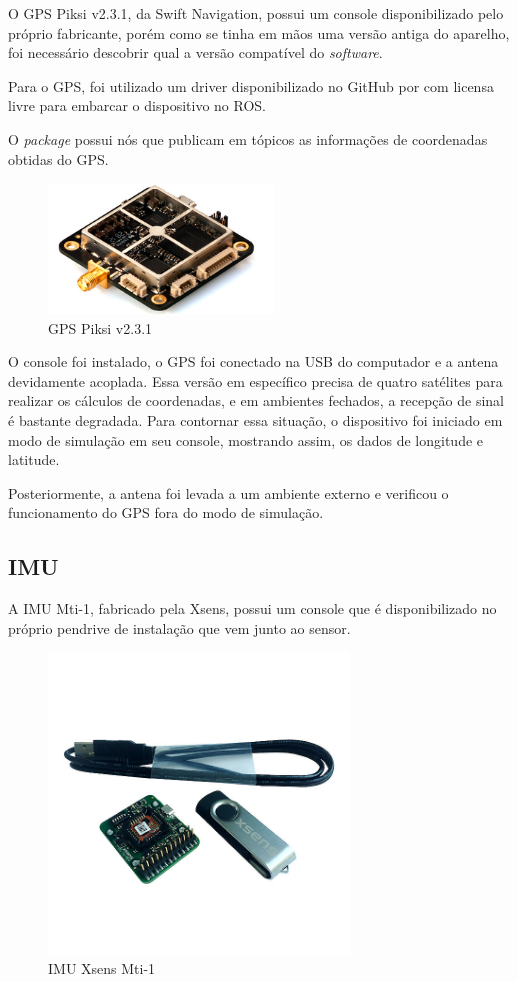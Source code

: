 	    O GPS Piksi v2.3.1, da Swift Navigation, possui um console disponibilizado pelo próprio fabricante, porém como se tinha em mãos uma versão antiga do aparelho, foi necessário descobrir qual a versão compatível do \textit{software}.
	    
	    Para o GPS, foi utilizado um driver disponibilizado no GitHub por  com licensa livre para embarcar o dispositivo no ROS.
     
     O \textit{package} possui nós que publicam em tópicos as informações de coordenadas obtidas do GPS.
	    
	    \begin{figure}[!ht]
				   \centering
				   \includegraphics[width=6cm]{Figures/gps.jpg}
				   \caption{GPS Piksi v2.3.1}
				   \label{fig:GPS}
		\end{figure}
			    
	     O console foi instalado, o GPS foi conectado na USB do computador e a antena devidamente acoplada. Essa versão em específico precisa de quatro satélites para realizar os cálculos de coordenadas, e em ambientes fechados, a recepção de sinal é bastante degradada. Para contornar essa situação, o dispositivo foi iniciado em modo de simulação em seu console, mostrando assim, os dados de longitude e latitude.
	     
	     Posteriormente, a antena foi levada a um ambiente externo e verificou o funcionamento do GPS fora do modo de simulação.    

	\subsection{IMU}
	    
	    A IMU Mti-1, fabricado pela Xsens, possui um console que é disponibilizado no próprio pendrive de instalação que vem junto ao sensor.
	    
	    \begin{figure}[!ht]
		   \centering
		   \includegraphics[width=8cm]{Figures/imu.jpg}
		   \caption{IMU Xsens Mti-1}
		   \label{fig:IMU}
		\end{figure}
	    
